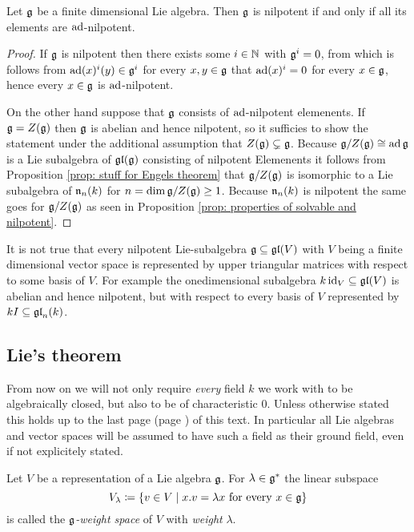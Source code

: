 \begin{thrm}[Engel]
 Let $\mathfrak{g}$ be a finite dimensional Lie algebra. Then $\mathfrak{g}$ is nilpotent if and only if all its elements are $\operatorname{ad}$-nilpotent.
\end{thrm}
\begin{proof}
 If $\mathfrak{g}$ is nilpotent then there exists some $i \in \mathbb{N}$ with $\mathfrak{g}^i = 0$, from which is follows from $\operatorname{ad}(x)^i(y) \in \mathfrak{g}^i$ for every $x,y \in \mathfrak{g}$ that $\operatorname{ad}(x)^i = 0$ for every $x \in \mathfrak{g}$, hence every $x \in \mathfrak{g}$ is $\operatorname{ad}$-nilpotent.
 
 On the other hand suppose that $\mathfrak{g}$ consists of $\operatorname{ad}$-nilpotent elemenents. If $\mathfrak{g} = Z(\mathfrak{g})$ then $\mathfrak{g}$ is abelian and hence nilpotent, so it sufficies to show the statement under the additional assumption that $Z(\mathfrak{g}) \subsetneq \mathfrak{g}$. Because $\mathfrak{g}/Z(\mathfrak{g}) \cong \operatorname{ad} \mathfrak{g}$ is a Lie subalgebra of $\mathfrak{gl}(\mathfrak{g})$ consisting of nilpotent Elemenents it follows from Proposition \ref{prop: stuff for Engels theorem} that $\mathfrak{g}/Z(\mathfrak{g})$ is isomorphic to a Lie subalgebra of $\mathfrak{n}_n(k)$ for $n = \dim \mathfrak{g}/Z(\mathfrak{g}) \geq 1$. Because $\mathfrak{n}_n(k)$ is nilpotent the same goes for $\mathfrak{g}/Z(\mathfrak{g})$ as seen in Proposition \ref{prop: properties of solvable and nilpotent}.
\end{proof}


\begin{warn}
 It is not true that every nilpotent Lie-subalgebra $\mathfrak{g} \subseteq \mathfrak{gl}(V)$ with $V$ being a finite dimensional vector space is represented by upper triangular matrices with respect to some basis of $V$. For example the onedimensional subalgebra $k \operatorname{id}_V \subseteq \mathfrak{gl}(V)$ is abelian and hence nilpotent, but with respect to every basis of $V$ represented by $kI \subseteq \mathfrak{gl}_n(k)$.
\end{warn}





\subsection{Lie’s theorem}


From now on we will not only require \emph{every} field $k$ we work with to be algebraically closed, but also to be of characteristic $0$. Unless otherwise stated this holds up to the last page (page \pageref{LastPage}) of this text. In particular all Lie algebras and vector spaces will be assumed to have such a field as their ground field, even if not explicitely stated.


\begin{defi}
 Let $V$ be a representation of a Lie algebra $\mathfrak{g}$. For $\lambda \in \mathfrak{g}^*$ the linear subspace
 \[
  V_\lambda \coloneqq \{v \in V \mid \text{$x.v = \lambda x$ for every $x \in \mathfrak{g}$}\}
 \]
 is called the \emph{$\mathfrak{g}$-weight space} of $V$ with \emph{weight} $\lambda$.
\end{defi}



